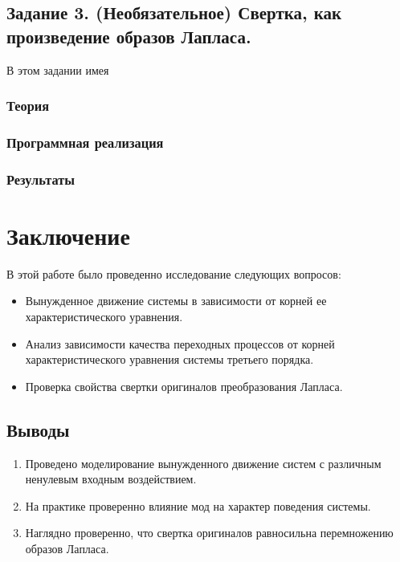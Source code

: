 \documentclass[16pt]{article}
\begin{document}
\pagebreak
\subsection{Задание 3. (Необязательное) Свертка, как произведение образов Лапласа.}
В этом задании имея 
\subsubsection{Теория}


\subsubsection{Программная реализация}

\subsubsection{Результаты}



\newpage
\section{Заключение}
В этой работе было проведенно исследование следующих вопросов:
\begin{itemize}
    \item Вынужденное движение системы в зависимости от корней ее характеристического уравнения. 
    \item Анализ зависимости качества переходных процессов от корней характеристического уравнения системы третьего порядка. 
    \item Проверка свойства свертки оригиналов преобразования Лапласа. 
\end{itemize} 
\subsection{Выводы}
\begin{enumerate}
   \item Проведено моделирование вынужденного движение систем с различным ненулевым входным воздействием.
   \item На практике проверенно влияние мод на характер поведения системы.
   \item Наглядно проверенно, что свертка оригиналов равносильна перемножению образов Лапласа.
\end{enumerate}
\end{document}
